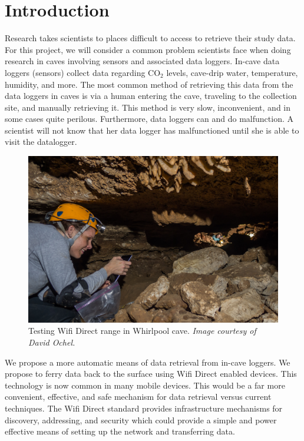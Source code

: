 \documentclass[10pt,twocolumn]{article}
\begin{document}
\section{Introduction}
Research takes scientists to places difficult to access to retrieve their study data. 
For this project, we will consider a common problem scientists face when doing research in caves involving sensors and associated data loggers. 
In-cave data loggers (sensors) collect data regarding CO$_2$ levels, cave-drip water, temperature, humidity, and more. 
The most common method of retrieving this data from the data loggers in caves is via a human entering the cave, traveling to the collection site, and manually retrieving it. 
This method is very slow, inconvenient, and in some cases quite perilous. 
Furthermore, data loggers can and do malfunction.
A scientist will not know that her data logger has malfunctioned until she is able to visit the datalogger.
\begin{figure}[t]
\includegraphics[width=\textwidth]{cavewifi2}
\caption{Testing Wifi Direct range in Whirlpool cave. \textit{Image courtesy of David Ochel.}}
\end{figure}
We propose a more automatic means of data retrieval from in-cave loggers. 
We propose to ferry data back to the surface using Wifi Direct enabled devices. 
This technology is now common in many mobile devices.
This would be a far more convenient, effective, and safe mechanism for data retrieval versus current techniques.  
The Wifi Direct standard provides infrastructure mechanisms for discovery, addressing, and security which could provide a simple and power effective means of setting up the network and transferring data. 
\end{document}
